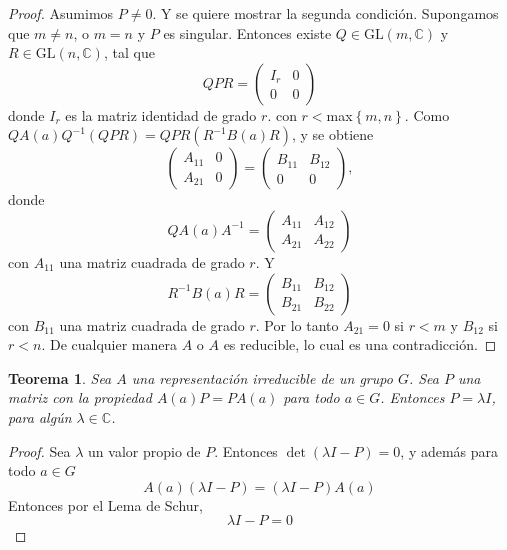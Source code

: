 \documentclass[12pt]{book}
\newtheorem{theorem}{Teorema}[section]
\theoremstyle{definition}
\newcounter{in}
\begin{document}
\begin{proof}
  Asumimos $P \neq 0$. Y se quiere mostrar la segunda
  condición. Supongamos que $m \neq n$, o $m=n$ y $P$ es
  singular. Entonces existe $Q \in \mathrm{GL}(m,\mathbb{C})$ y
  $R \in \mathrm{GL}(n,\mathbb{C})$, tal que
  \begin{equation}
    \label{eq:16}
    QPR=
    \begin{pmatrix}
      I_{r} & 0 \\ 
      0 & 0
    \end{pmatrix} 
  \end{equation}
  donde $I_{r}$ es la matriz identidad de grado $r$. con
  $r<$max$\left\{ m,n \right\}$. Como
  $QA(a)Q^{-1}(QPR) = QPR(R^{-1}B(a)R)$, y se obtiene
  \begin{equation}
    \label{eq:17}
    \begin{pmatrix}
      A_{11} & 0 \\ 
      A_{21} & 0
    \end{pmatrix}
    =
    \begin{pmatrix}
      B_{11} & B_{12} \\ 
      0 & 0
    \end{pmatrix},
  \end{equation}
  donde
  \begin{equation}
    \label{eq:18}
    QA(a)A^{-1}=
    \begin{pmatrix}
      A_{11} & A_{12} \\ 
      A_{21} & A_{22}
    \end{pmatrix} 
  \end{equation}  
  con $A_{11}$ una matriz cuadrada de grado $r$. Y
  \begin{equation}
    \label{eq:19}
    R^{-1}B(a)R=
    \begin{pmatrix}
      B_{11} & B_{12} \\ 
      B_{21} & B_{22}
    \end{pmatrix}
  \end{equation}
  con $B_{11}$ una matriz cuadrada de grado $r$. Por lo tanto
  $A_{21}=0$ si $r<m$ y $B_{12}$ si $r<n$. De cualquier manera
  $A$ o $A$ es reducible, lo cual es una
  contradicción.
\end{proof}

\begin{theorem}
  \label{t3_2}
  Sea $A$ una representación irreducible de un
  grupo $G$. Sea $P$ una matriz con la propiedad $A(a)P=PA(a)$ para todo
  $a \in G$. Entonces $P=\lambda I$, para algún
  $\lambda \in \mathbb{C}$.
\end{theorem}
\begin{proof}
  Sea $\lambda$ un valor propio de $P$. Entonces
  $\det(\lambda I - P)=0$, y además para todo $a \in G$
  \begin{equation}
    \label{eq:20}
    A(a)(\lambda I - P)=(\lambda I - P)A(a)
  \end{equation}
  Entonces por el Lema de Schur,
  \begin{equation}
    \label{eq:21}
    \lambda I-P=0
  \end{equation}
\end{proof}
\end{document}
